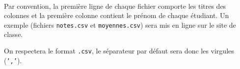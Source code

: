 \exer{[FIC-004]}
\setcounter{numques}{0}~\\


Par convention, la première ligne de chaque fichier comporte les titres des colonnes et la première colonne contient le prénom de chaque étudiant. Un exemple (fichiers \texttt{notes.csv} et \texttt{moyennes.csv}) sera mis en ligne sur le site de classe. 

On respectera le format  \texttt{.csv}, le séparateur par défaut sera donc les virgules (\texttt{','}). 